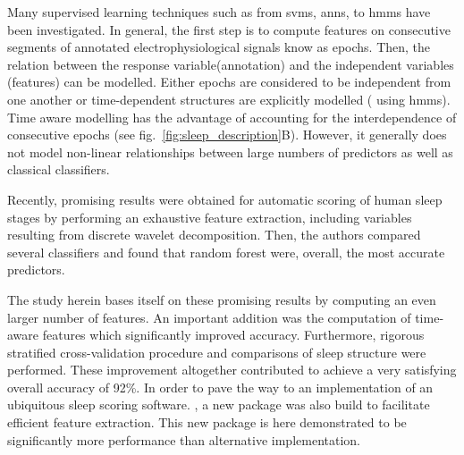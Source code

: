 Many supervised learning techniques such as from \glspl{svm}, \glspl{ann}, to \glspl{hmm} have been investigated.
In general, the first step is to compute features on consecutive segments of annotated electrophysiological signals know as epochs.
Then, the relation between the response variable(annotation) and the independent variables (features) can be modelled.
Either epochs are considered to be independent from one another or time-dependent structures are explicitly modelled (\eg{} using \glspl{hmm}).
Time aware modelling has the advantage of accounting for the interdependence of consecutive epochs (see fig.~\ref{fig:sleep_description}B).
However, it generally does not model non-linear relationships between large numbers of predictors as well as classical classifiers.

Recently, promising results were obtained for automatic scoring of human sleep stages by performing an exhaustive
feature extraction, including variables resulting from discrete wavelet decomposition.
Then, the authors compared several classifiers and found that random forest were, overall, the most accurate predictors.

The study herein bases itself on these promising results by computing an even larger number of features.
An important addition was the computation of time-aware features which significantly improved accuracy.
Furthermore, rigorous stratified cross-validation procedure and comparisons of sleep structure were performed.
These improvement altogether contributed to achieve a very satisfying overall accuracy of 92\%.
In order to pave the way to an implementation of an ubiquitous sleep scoring software.
\pr, a new \py{} package was also build to facilitate efficient feature extraction.
This new package is here demonstrated to be significantly more performance than alternative implementation.


